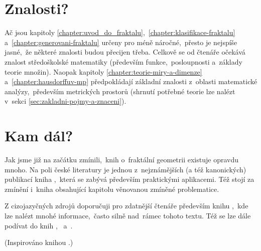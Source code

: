 \section*{Znalosti?}

Ač jsou kapitoly \ref{chapter:uvod_do_fraktalu},~\ref{chapter:klasifikace-fraktalu} a~\ref{chapter:generovani-fraktalu} určeny pro méně náročné,~přesto je nejspíše jasné,~že některé znalosti budou přecijen třeba. Celkově se od čtenáře očekává znalost středoškolské matematiky (především funkce,~posloupnosti a~základy teorie množin). Naopak kapitoly \ref{chapter:teorie-miry-a-dimenze} a~\ref{chapter:hausdorffuv-mp} předpokládají základní znalosti z~oblasti matematické analýzy,~především metrických prostorů (shrnutí potřebné teorie lze nalézt v~sekci \ref{sec:zakladni-pojmy-a-znaceni}).

\section*{Kam dál?}

Jak jsme již na začátku zmínili,~knih o~fraktální geometrii existuje opravdu mnoho. Na poli české literatury je jednou z~nejznámějších (a též kanonických) publikací kniha \cite{Zelinka2006},~která se zabývá především praktickými aplikacemi. Též stojí za zmínění i~kniha \cite{Voracova2022} obsahující kapitolu věnovanou zmíněné problematice.

Z cizojazyčných zdrojů doporučuji pro zdatnější čtenáře především knihu \cite{Falconer1989},~kde lze nalézt mnohé informace,~často silně nad~rámec tohoto textu. Též se lze dále podívat do knih \cite{Prusinkiewicz1990},~\cite{Edgar2008} a~\cite{Mattila1995}.

(Inspirováno knihou \cite{Hladik2019}.)